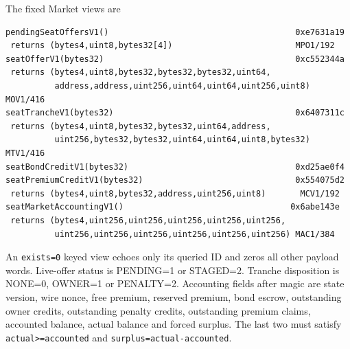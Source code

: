 \documentclass[a4paper,11pt]{article}
\newcommand{\code}[1]{\nolinkurl{#1}}
\begin{document}
The fixed Market views are
\begin{verbatim}
pendingSeatOffersV1()                                      0xe7631a19
 returns (bytes4,uint8,bytes32[4])                         MPO1/192
seatOfferV1(bytes32)                                       0xc552344a
 returns (bytes4,uint8,bytes32,bytes32,bytes32,uint64,
          address,address,uint256,uint64,uint64,uint256,uint8) MOV1/416
seatTrancheV1(bytes32)                                     0x6407311c
 returns (bytes4,uint8,bytes32,bytes32,uint64,address,
          uint256,bytes32,bytes32,uint64,uint64,uint8,bytes32) MTV1/416
seatBondCreditV1(bytes32)                                  0xd25ae0f4
seatPremiumCreditV1(bytes32)                               0x554075d2
 returns (bytes4,uint8,bytes32,address,uint256,uint8)       MCV1/192
seatMarketAccountingV1()                                  0x6abe143e
 returns (bytes4,uint256,uint256,uint256,uint256,uint256,
          uint256,uint256,uint256,uint256,uint256,uint256) MAC1/384
\end{verbatim}
An \code{exists=0} keyed view echoes only its queried ID and zeros all other
payload words.  Live-offer status is PENDING=1 or STAGED=2.  Tranche disposition
is NONE=0, OWNER=1 or PENALTY=2.  Accounting fields after magic are state
version, wire nonce, free premium, reserved premium, bond escrow, outstanding
owner credits, outstanding penalty credits, outstanding premium claims,
accounted balance, actual balance and forced surplus.  The last two must satisfy
\code{actual>=accounted} and \code{surplus=actual-accounted}.
\end{document}
